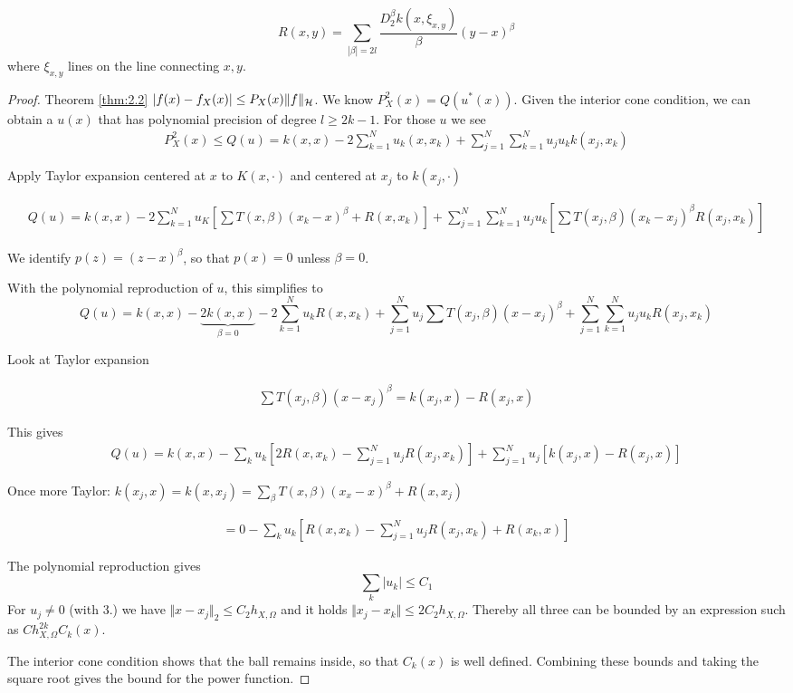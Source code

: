 \[R(x,y)=\sum_{|\beta|=2l}\frac{D_2^\beta k(x,\xi_{x,y})}{\beta}(y-x)^\beta\]
where $\xi_{x,y}$ lines on the line connecting $x,y$.

\begin{proof}
    Theorem \ref{thm:2.2} $|f(x)-f_X(x)|\leq P_X(x)\Vert f\Vert_{\mathcal{H}}$. 
    We know $P_X^2(x)=Q(u^*(x))$. Given the interior cone condition, we 
    can obtain a $u(x)$ that has polynomial precision of degree $l\geq 2k-1$. 
    For those $u$ we see 
    \begin{align*}
        P_X^2(x)\leq Q(u)=k(x,x)-2\sum_{k=1}^{N}u_k(x,x_k)+\sum_{j=1}^{N}\sum_{k=1}^{N} u_ju_k k(x_j,x_k)
\end{align*}

Apply Taylor expansion centered at $x$ to $K(x,\cdot)$ and centered at $x_j$ to $k(x_j,\cdot)$

\begin{align*}
    Q(u)=k(x,x)-2\sum_{k=1}^{N}u_K\left[\sum T(x,\beta)(x_k-x)^\beta+R(x,x_k) \right]+\sum_{j=1}^{N}\sum_{k=1}^N u_j u_k \left[\sum T(x_j,\beta)(x_k-x_j)^\beta R(x_j,x_k) \right]
\end{align*}

We identify $p(z)=(z-x)^\beta$, so that $p(x)=0$ unless $\beta=0$.

With the polynomial reproduction of $u$, this simplifies to 
\[Q(u)=k(x,x)-\underbrace{2k(x,x)}_{\beta=0}-2\sum_{k=1}^N u_k R(x,x_k)+\sum_{j=1}^{N} u_j\sum T(x_j,\beta)(x-x_j)^\beta+\sum_{j=1}^N\sum_{k=1}^N u_ju_k R(x_j,x_k)\] 

Look at Taylor expansion 

\begin{align*}
    \sum T(x_j,\beta)(x-x_j)^\beta = k(x_j,x)-R(x_j,x)
\end{align*}

This gives 
\begin{align*}
    Q(u)=k(x,x)-\sum_{k}u_k\left[2R(x,x_k)-\sum_{j=1}^N u_j R(x_j,x_k) \right]+\sum_{j=1}^N u_j \left[k(x_j,x)-R(x_j,x)\right]
\end{align*}

Once more Taylor: $k(x_j,x)=k(x,x_j)=\sum_\beta T(x,\beta)(x_x-x)^\beta+R(x,x_j)$

\begin{align*}
    =0-\sum_k u_k \left[R(x,x_k)-\sum_{j=1}^N u_j R(x_j,x_k)+R(x_k,x) \right]
\end{align*}

The polynomial reproduction gives 
\[\sum_{k}|u_k|\leq C_1\]
For $u_j\neq 0$ (with 3.) we have $\Vert x-x_j\Vert_2 \leq C_2 h_{X,\Omega}$
and it holds $\Vert x_j-x_k\Vert \leq 2C_2h_{X,\Omega}$. Thereby all three can be bounded by
an expression such as $Ch_{X,\Omega}^{2k}C_k(x)$.

The interior cone condition shows that the ball remains inside, so that 
$C_k(x)$ is well defined. Combining these bounds and taking the square root gives 
the bound for the power function.
\end{proof}

